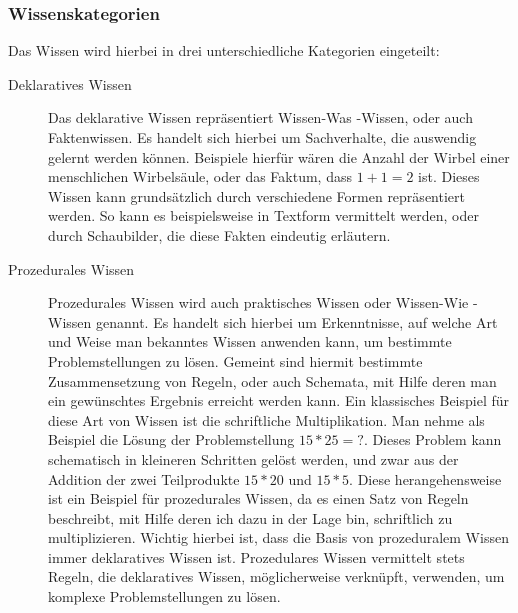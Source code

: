 \subsubsection{Wissenskategorien}
Das Wissen wird hierbei in drei unterschiedliche Kategorien eingeteilt:

\begin{description}
	\item[Deklaratives Wissen]
  Das deklarative Wissen repräsentiert \glqq Wissen-Was\grqq{} -Wissen, oder auch Faktenwissen.
	Es handelt sich hierbei um Sachverhalte, die
	auswendig gelernt werden können. Beispiele hierfür wären die Anzahl der Wirbel einer menschlichen Wirbelsäule,
	oder das Faktum, dass \(1+1=2\) ist.
	Dieses Wissen kann grundsätzlich durch verschiedene Formen repräsentiert werden.
	So kann es beispielsweise in Textform vermittelt werden, oder durch Schaubilder,
	die diese Fakten eindeutig erläutern.

	\item[Prozedurales Wissen]
  Prozedurales Wissen wird auch praktisches Wissen oder \glqq Wissen-Wie\grqq{} -Wissen genannt.
	Es handelt sich hierbei um Erkenntnisse, auf welche Art und Weise man bekanntes Wissen anwenden kann,
	um bestimmte Problemstellungen zu lösen.
	Gemeint sind hiermit bestimmte Zusammensetzung von Regeln, oder auch Schemata, mit Hilfe deren man
	ein gewünschtes Ergebnis erreicht werden kann.
	Ein klassisches Beispiel für diese Art von Wissen ist die schriftliche Multiplikation.
	Man nehme als Beispiel die Lösung der Problemstellung \(15*25=?\).
	Dieses Problem kann schematisch in kleineren Schritten gelöst werden, und zwar aus der Addition der
	zwei Teilprodukte \(15*20\) und \(15*5\).
	Diese herangehensweise ist ein Beispiel für prozedurales Wissen, da es einen Satz von Regeln beschreibt,
	mit Hilfe deren ich dazu in der Lage bin, schriftlich zu multiplizieren.
	Wichtig hierbei ist, dass die Basis von prozeduralem Wissen immer deklaratives Wissen ist.
	Prozedulares Wissen vermittelt stets Regeln, die deklaratives Wissen, möglicherweise verknüpft, verwenden,
	um komplexe Problemstellungen zu lösen.


\end{description}

